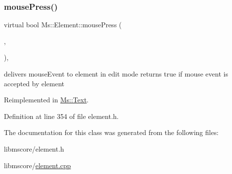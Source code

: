 \mbox{\label{class_ms_1_1_element_a794cd19d8af68dde867bab5a0bf75344}} 
\subsubsection{\texorpdfstring{mouse\+Press()}{mousePress()}}
{\footnotesize\ttfamily virtual bool Ms\+::\+Element\+::mouse\+Press (\begin{DoxyParamCaption}\item[{\hyperlink{class_ms_1_1_edit_data}{Edit\+Data} \&}]{,  }\item[{Q\+Mouse\+Event $\ast$}]{ }\end{DoxyParamCaption})\hspace{0.3cm}{\ttfamily [inline]}, {\ttfamily [virtual]}}

delivers mouse\+Event to element in edit mode returns true if mouse event is accepted by element 

Reimplemented in \hyperlink{class_ms_1_1_text_a39d82a468510e394017eb10fb9bc3e63}{Ms\+::\+Text}.



Definition at line 354 of file element.\+h.



The documentation for this class was generated from the following files\+:\begin{DoxyCompactItemize}
\item 
libmscore/element.\+h\item 
libmscore/\hyperlink{element_8cpp}{element.\+cpp}\end{DoxyCompactItemize}
